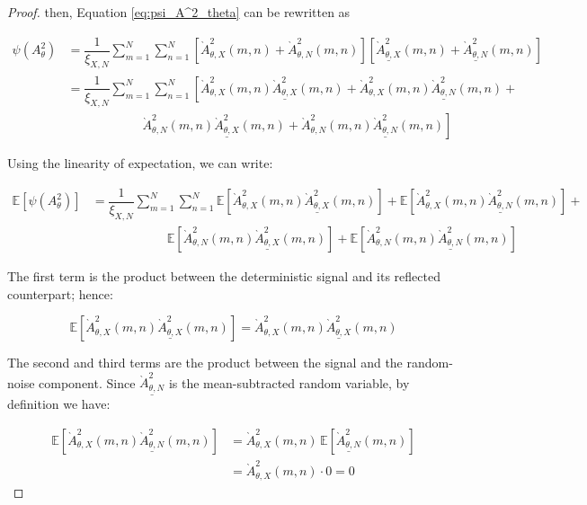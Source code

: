 \begin{proof}
then, Equation \ref{eq:psi_A^2_theta} can be rewritten as

    \begin{align}
        \psi(A^2_\theta) &= \dfrac{1}{\xi_{X,N}} \sum_{m=1}^N \sum_{n=1}^N \left[\grave{A}^2_{\theta,X}(m,n) + \grave{A}^2_{\theta,N}(m,n) \right] \left[ \underline{ \grave{A}^2_{\theta,X}}(m,n) + \underline{\grave{A}^2_{\theta,N}}(m,n) \right]\\
        &= \dfrac{1}{\xi_{X,N}} \sum_{m=1}^N \sum_{n=1}^N \left[ \grave{A}^2_{\theta,X}(m,n) \underline{\grave{A}^2_{\theta,X}}(m,n) + \grave{A}^2_{\theta,X}(m,n) \underline{\grave{A}^2_{\theta,N}}(m,n) + \nonumber \right. \\
        & \quad\quad\quad\quad\quad\quad \left. \grave{A}^2_{\theta,N}(m,n) \underline{\grave{A}^2_{\theta,X}}(m,n) + \grave{A}^2_{\theta,N}(m,n) \underline{\grave{A}^2_{\theta,N}}(m,n) \right]
    \end{align}

Using the linearity of expectation, we can write:

\begin{align}
\label{eq:E[psi]}
    \mathbb{E}\left[ \psi(A^2_\theta) \right] &= \dfrac{1}{\xi_{X,N}} \sum_{m=1}^N \sum_{n=1}^N \mathbb{E}\left[ \grave{A}^2_{\theta,X}(m,n) \underline{\grave{A}^2_{\theta,X}}(m,n) \right] + \mathbb{E}\left[ \grave{A}^2_{\theta,X}(m,n) \underline{\grave{A}^2_{\theta,N}}(m,n) \right] + \nonumber \\
        & \quad\quad\quad\quad\quad\quad \mathbb{E}\left[ \grave{A}^2_{\theta,N}(m,n) \underline{\grave{A}^2_{\theta,X}}(m,n) \right] + \mathbb{E}\left[ \grave{A}^2_{\theta,N}(m,n) \underline{\grave{A}^2_{\theta,N}}(m,n) \right]
\end{align}

The first term is the product between the deterministic signal and its reflected counterpart; hence:

\begin{equation}
    \mathbb{E}\left[ \grave{A}^2_{\theta,X}(m,n) \underline{\grave{A}^2_{\theta,X}}(m,n) \right] = \grave{A}^2_{\theta,X}(m,n) \underline{\grave{A}^2_{\theta,X}}(m,n)
\end{equation}

The second and third terms are the product between the signal and the random-noise component. Since $\underline{\grave{A}^2_{\theta,N}}$ is the mean-subtracted random variable, by definition we have:

\begin{align}
    \mathbb{E}\left[ \grave{A}^2_{\theta,X}(m,n) \underline{\grave{A}^2_{\theta,N}}(m,n) \right] &= \grave{A}^2_{\theta,X}(m,n)\, \mathbb{E}\left[ 
 \underline{\grave{A}^2_{\theta,N}}(m,n) \right] \\
 &= \grave{A}^2_{\theta,X}(m,n) \cdot 0 = 0
\end{align}


\end{proof}
